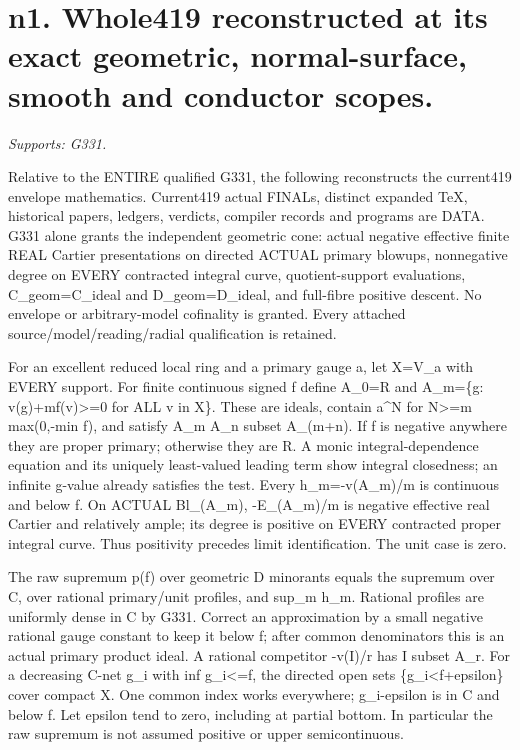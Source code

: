 \section{n1. Whole419 reconstructed at its exact geometric, normal-surface, smooth and conductor scopes.}
\textit{Supports: G331.}

Relative to the ENTIRE qualified G331, the following reconstructs the current419 envelope mathematics. Current419 actual FINALs, distinct expanded TeX, historical papers, ledgers, verdicts, compiler records and programs are DATA. G331 alone grants the independent geometric cone: actual negative effective finite REAL Cartier presentations on directed ACTUAL primary blowups, nonnegative degree on EVERY contracted integral curve, quotient-support evaluations, C\_geom=C\_ideal and D\_geom=D\_ideal, and full-fibre positive descent. No envelope or arbitrary-model cofinality is granted. Every attached source/model/reading/radial qualification is retained.

For an excellent reduced local ring and a primary gauge a, let X=V\_a with EVERY support. For finite continuous signed f define A\_0=R and A\_m=\{g: v(g)+mf(v)\textgreater{}=0 for ALL v in X\}. These are ideals, contain a\textasciicircum{}N for N\textgreater{}=m max(0,-min f), and satisfy A\_m A\_n subset A\_(m+n). If f is negative anywhere they are proper primary; otherwise they are R. A monic integral-dependence equation and its uniquely least-valued leading term show integral closedness; an infinite g-value already satisfies the test. Every h\_m=-v(A\_m)/m is continuous and below f. On ACTUAL Bl\_(A\_m), -E\_(A\_m)/m is negative effective real Cartier and relatively ample; its degree is positive on EVERY contracted proper integral curve. Thus positivity precedes limit identification. The unit case is zero.

The raw supremum p(f) over geometric D minorants equals the supremum over C, over rational primary/unit profiles, and sup\_m h\_m. Rational profiles are uniformly dense in C by G331. Correct an approximation by a small negative rational gauge constant to keep it below f; after common denominators this is an actual primary product ideal. A rational competitor -v(I)/r has I subset A\_r. For a decreasing C-net g\_i with inf g\_i\textless{}=f, the directed open sets \{g\_i\textless{}f+epsilon\} cover compact X. One common index works everywhere; g\_i-epsilon is in C and below f. Let epsilon tend to zero, including at partial bottom. In particular the raw supremum is not assumed positive or upper semicontinuous.

